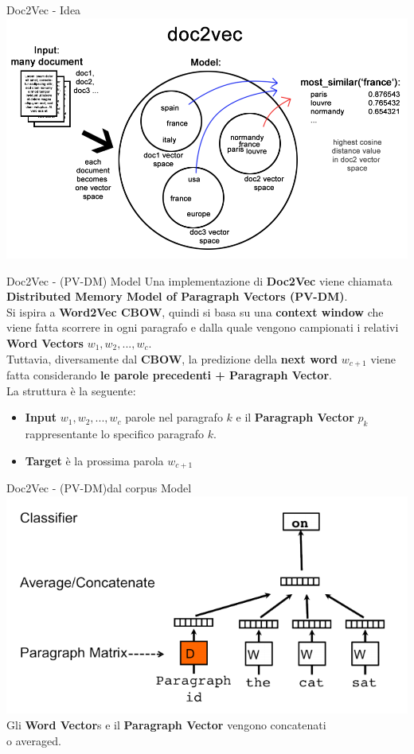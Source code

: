\documentclass[british]{beamer}
\begin{document}
\begin{frame}{Doc2Vec - Idea}
	\includegraphics[width=\textwidth]{./Imgs/doc2vec-working.png}
\end{frame}

\begin{frame}{Doc2Vec - (PV-DM) Model}
	Una implementazione di \textbf{Doc2Vec} viene chiamata \textbf{Distributed Memory Model of Paragraph Vectors (PV-DM)}.\\
	Si ispira a \textbf{Word2Vec CBOW}, quindi si basa su una \textbf{context window} che viene fatta scorrere in ogni paragrafo e dalla quale vengono campionati i relativi \textbf{Word Vectors} $w_{1}, w_{2}, ...,w_{c}$.\\
	Tuttavia, diversamente dal \textbf{CBOW}, la predizione della \textbf{next word} $w_{c+1}$ viene fatta considerando \textbf{le parole precedenti + Paragraph Vector}.\\
	La struttura \`{e} la seguente:
	\begin{itemize}
		\item \textbf{Input} $w_{1}, w_{2}, ...,w_{c}$ parole nel paragrafo $k$ e il \textbf{Paragraph Vector} $p_k $ rappresentante lo specifico paragrafo $k$.
		\item \textbf{Target} \`{e} la prossima parola $w_{c+1}$
	\end{itemize}
\end{frame}

\begin{frame}{Doc2Vec - (PV-DM)dal corpus Model}
	\includegraphics[width= 0.9\linewidth]{./Imgs/d2v-cbow.png}
	\\Gli \textbf{Word Vector}s e il \textbf{Paragraph Vector} vengono concatenati\\ o averaged.
\end{frame}
\end{document}
